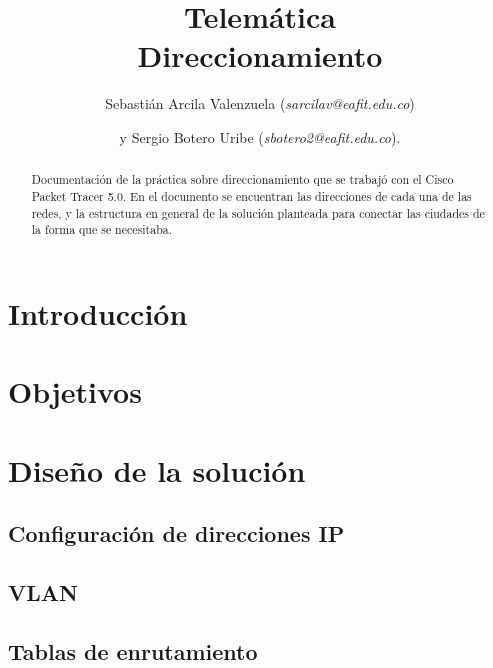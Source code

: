 \documentclass[
	final,
	notitlepage,
	narroweqnarray,
	inline,
	twoside,
	]{ieee}
\begin{document}
\title[direccionamiento]{
       Telemática\\ Direccionamiento}


\author[]{Sebastián Arcila Valenzuela (\textit{sarcilav@eafit.edu.co})
\and{}y Sergio Botero Uribe (\textit{sbotero2@eafit.edu.co}).
}

\titletext{, \today}
\maketitle               

\begin{abstract} 
Documentación de la práctica sobre direccionamiento que se trabajó con el Cisco Packet Tracer 5.0. En el documento se encuentran las direcciones de
cada una de las redes, y la estructura en general de la solución planteada para conectar las ciudades de la forma que se necesitaba.\\
\end{abstract}

\section{Introducción}
	

\section{Objetivos}
	

\section{Diseño de la solución}
	

	\subsection{Configuración de direcciones IP}
		
	\subsection{VLAN}
		
	\subsection{Tablas de enrutamiento}
		

	
\end{document}

